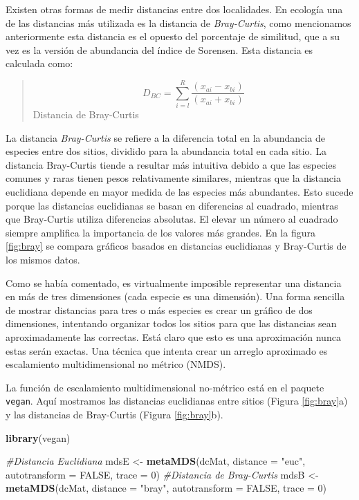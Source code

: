\documentclass[]{book}
\newenvironment{Shaded}{\begin{snugshade}}{\end{snugshade}}
\newcommand{\KeywordTok}[1]{\textcolor[rgb]{0.13,0.29,0.53}{\textbf{{#1}}}}
\newcommand{\DataTypeTok}[1]{\textcolor[rgb]{0.13,0.29,0.53}{{#1}}}
\newcommand{\DecValTok}[1]{\textcolor[rgb]{0.00,0.00,0.81}{{#1}}}
\newcommand{\StringTok}[1]{\textcolor[rgb]{0.31,0.60,0.02}{{#1}}}
\newcommand{\CommentTok}[1]{\textcolor[rgb]{0.56,0.35,0.01}{\textit{{#1}}}}
\newcommand{\OtherTok}[1]{\textcolor[rgb]{0.56,0.35,0.01}{{#1}}}
\newcommand{\NormalTok}[1]{{#1}}
\begin{document}
Existen otras formas de medir distancias entre dos localidades. En
ecología una de las distancias más utilizada es la distancia de
\emph{Bray-Curtis}, como mencionamos anteriormente esta distancia es el
opuesto del porcentaje de similitud, que a su vez es la versión de
abundancia del índice de Sorensen. Esta distancia es calculada como:

\begin{quote}
\[D_{BC} = \sum_{i=l}^R \frac{(x_{ai} - x_{bi})}{(x_{ai} + x_{bi})}\]
Distancia de Bray-Curtis
\end{quote}

La distancia \emph{Bray-Curtis} se refiere a la diferencia total en la
abundancia de especies entre dos sitios, dividido para la abundancia
total en cada sitio. La distancia Bray-Curtis tiende a resultar más
intuitiva debido a que las especies comunes y raras tienen pesos
relativamente similares, mientras que la distancia euclidiana depende en
mayor medida de las especies más abundantes. Esto sucede porque las
distancias euclidianas se basan en diferencias al cuadrado, mientras que
Bray-Curtis utiliza diferencias absolutas. El elevar un número al
cuadrado siempre amplifica la importancia de los valores más grandes. En
la figura \ref{fig:bray} se compara gráficos basados en distancias
euclidianas y Bray-Curtis de los mismos datos.

Como se había comentado, es virtualmente imposible representar una
distancia en más de tres dimensiones (cada especie es una dimensión).
Una forma sencilla de mostrar distancias para tres o más especies es
crear un gráfico de dos dimensiones, intentando organizar todos los
sitios para que las distancias sean aproximadamente las correctas. Está
claro que esto es una aproximación nunca estas serán exactas. Una
técnica que intenta crear un arreglo aproximado es escalamiento
multidimensional no métrico (NMDS).

La función de escalamiento multidimensional no-métrico está en el
paquete \texttt{vegan}. Aquí mostramos las distancias euclidianas entre
sitios (Figura \ref{fig:bray}a) y las distancias de Bray-Curtis (Figura
\ref{fig:bray}b).

\begin{Shaded}
\begin{Highlighting}[]
\KeywordTok{library}\NormalTok{(vegan) }

\CommentTok{#Distancia Euclidiana}
\NormalTok{mdsE <-}\StringTok{ }\KeywordTok{metaMDS}\NormalTok{(dcMat, }\DataTypeTok{distance =} \StringTok{"euc"}\NormalTok{, }\DataTypeTok{autotransform =} \OtherTok{FALSE}\NormalTok{, }\DataTypeTok{trace =} \DecValTok{0}\NormalTok{) }
\CommentTok{#Distancia de Bray-Curtis}
\NormalTok{mdsB <-}\StringTok{ }\KeywordTok{metaMDS}\NormalTok{(dcMat, }\DataTypeTok{distance =} \StringTok{"bray"}\NormalTok{, }\DataTypeTok{autotransform =} \OtherTok{FALSE}\NormalTok{, }\DataTypeTok{trace =} \DecValTok{0}\NormalTok{) }
\end{Highlighting}
\end{Shaded}
\end{document}
